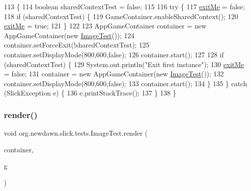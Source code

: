 \begin{DoxyCode}
113                                            \{
114         \textcolor{keywordtype}{boolean} sharedContextTest = \textcolor{keyword}{false};
115         
116         \textcolor{keywordflow}{try} \{
117             \mbox{\hyperlink{classorg_1_1newdawn_1_1slick_1_1tests_1_1_image_test_ab4f8dc82794bf9949ac7efc7c1121bcc}{exitMe}} = \textcolor{keyword}{false};
118             \textcolor{keywordflow}{if} (sharedContextTest) \{
119                 GameContainer.enableSharedContext();
120                 \mbox{\hyperlink{classorg_1_1newdawn_1_1slick_1_1tests_1_1_image_test_ab4f8dc82794bf9949ac7efc7c1121bcc}{exitMe}} = \textcolor{keyword}{true};
121             \}
122             
123             AppGameContainer container = \textcolor{keyword}{new} AppGameContainer(\textcolor{keyword}{new} \mbox{\hyperlink{classorg_1_1newdawn_1_1slick_1_1tests_1_1_image_test_a6a0fed2502d5b4cfd51e5a5a57bf5e5e}{ImageTest}}());
124             container.setForceExit(!sharedContextTest);
125             container.setDisplayMode(800,600,\textcolor{keyword}{false});
126             container.start();
127             
128             \textcolor{keywordflow}{if} (sharedContextTest) \{
129                 System.out.println(\textcolor{stringliteral}{"Exit first instance"});
130                 \mbox{\hyperlink{classorg_1_1newdawn_1_1slick_1_1tests_1_1_image_test_ab4f8dc82794bf9949ac7efc7c1121bcc}{exitMe}} = \textcolor{keyword}{false};
131                 container = \textcolor{keyword}{new} AppGameContainer(\textcolor{keyword}{new} \mbox{\hyperlink{classorg_1_1newdawn_1_1slick_1_1tests_1_1_image_test_a6a0fed2502d5b4cfd51e5a5a57bf5e5e}{ImageTest}}());
132                 container.setDisplayMode(800,600,\textcolor{keyword}{false});
133                 container.start();
134             \}
135         \} \textcolor{keywordflow}{catch} (SlickException e) \{
136             e.printStackTrace();
137         \}
138     \}
\end{DoxyCode}
\mbox{\label{classorg_1_1newdawn_1_1slick_1_1tests_1_1_image_test_aa275b004e2f4bbfe09b5eba234a2224a}} 
\subsubsection{\texorpdfstring{render()}{render()}}
{\footnotesize\ttfamily void org.\+newdawn.\+slick.\+tests.\+Image\+Test.\+render (\begin{DoxyParamCaption}\item[{\mbox{\hyperlink{classorg_1_1newdawn_1_1slick_1_1_game_container}{Game\+Container}}}]{container,  }\item[{\mbox{\hyperlink{classorg_1_1newdawn_1_1slick_1_1_graphics}{Graphics}}}]{g }\end{DoxyParamCaption})\hspace{0.3cm}{\ttfamily [inline]}}

